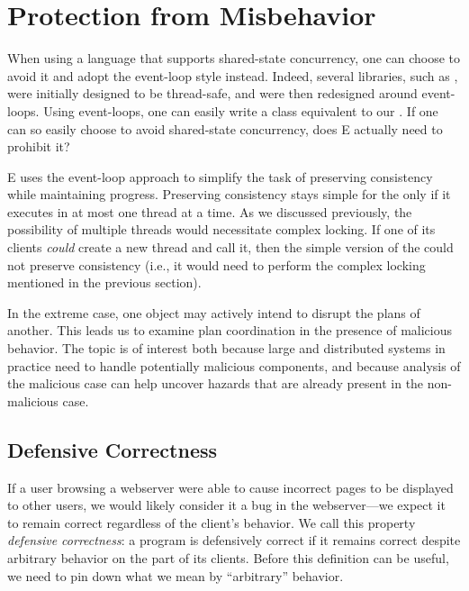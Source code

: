 \documentclass{llncs}
\begin{document}
\section{Protection from Misbehavior}

When using a language that supports shared-state concurrency, one can
choose to avoid it and adopt the event-loop style instead. Indeed,
several  libraries, such as , were initially
designed to be thread-safe, and were then redesigned around
event-loops. Using event-loops, one can easily write a 
class equivalent to our .  If one can so easily
choose to avoid shared-state concurrency, does E actually need to
prohibit it?

E uses the event-loop approach to simplify the task of preserving
consistency while maintaining progress. Preserving consistency stays
simple for the  only if it executes in at most one
thread at a time.  As we discussed previously, the possibility of
multiple threads would necessitate complex locking. If one of its clients
\emph{could} create a new thread and call it, then the simple version
of the  could not preserve consistency (i.e., it
would need to perform the complex locking mentioned in the previous
section). 

In the extreme case, one object may actively intend to disrupt the plans
of another.  This leads us to examine plan coordination in the
presence of malicious behavior.  The topic is of interest both because
large and distributed systems in practice need to handle potentially
malicious components, and because analysis of the malicious case can
help uncover hazards that are already present in the non-malicious case.

\subsection{Defensive Correctness}

If a user browsing a webserver were able to cause incorrect pages to
be displayed to other users, we would likely consider it a bug in the
webserver---we expect it to remain correct regardless of the client's
behavior.  We call this property \emph{defensive correctness}: a
program  is defensively correct if it remains correct despite
arbitrary behavior on the part of its clients.  Before this definition
can be useful, we need to pin down what we mean by ``arbitrary''
behavior.
\end{document}
